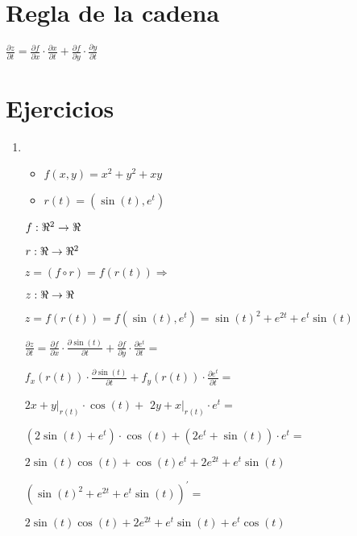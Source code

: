 \documentclass[../practica_04.tex]{subfiles}
\begin{document}
    \section*{Regla de la cadena}

        $\frac{\partial z}{\partial t} = 
            \frac{\partial f}{\partial x} \cdot \frac{\partial x}{\partial t} +
            \frac{\partial f}{\partial y} \cdot \frac{\partial y}{\partial t} $

    \section*{Ejercicios}

    \begin{enumerate}
        \item
            \begin{itemize}
                \item $f(x,y) = x^2 + y^2 + xy$
                \item $r(t) = (\sin(t), e^t)$
            \end{itemize}

            $ f : \real^2 \to \real $

            $ r : \real \to \real^2 $

            $ z = (f \circ r) = f(r(t)) \Rightarrow $

            $ z : \real \to \real $

            $ z = f(r(t)) = f(\sin(t), e^t) = \sin(t)^2 + e^{2t} + e^t\sin(t) $

            $ \frac{\partial z}{\partial t} = \frac{\partial f}{\partial x} \cdot \frac{\partial \sin(t)}{\partial t} +
            \frac{\partial f}{\partial y} \cdot \frac{\partial e^t}{\partial t} = $

            $ f_x(r(t))  \cdot \frac{\partial \sin(t)}{\partial t} + f_y(r(t))\cdot \frac{\partial e^t}{\partial t} = $

            $ \left. 2x + y \right|_{r(t)} \cdot \cos(t) + $
            $ \left. 2y + x \right|_{r(t)} \cdot e^t = $

            $ (2\sin(t) + e^t) \cdot \cos(t) + (2e^t + \sin(t)) \cdot e^t =  $

            $ 2\sin(t)\cos(t) + \cos(t)e^t + 2e^{2t} + e^t\sin(t) $

            $ (\sin(t)^2 + e^{2t} + e^t\sin(t))^\prime = $
            
            $2\sin(t)\cos(t) + 2e^{2t} + e^t\sin(t) + e^t\cos(t) $


\end{enumerate}
\end{document}
